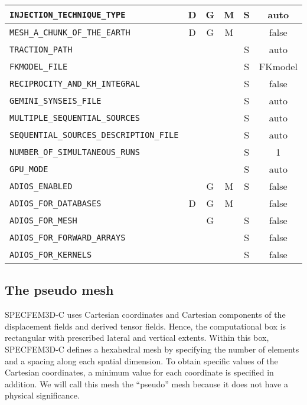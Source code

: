 \begin{longtable}{|p{7.7cm}|c|c|c|c|c|}
      \verb+INJECTION_TECHNIQUE_TYPE+      & D & G & M & S & auto \\ \hline
      \verb+MESH_A_CHUNK_OF_THE_EARTH+     & D & G & M &   & false \\ \hline
      \verb+TRACTION_PATH+                 &   &   &   & S & auto \\ \hline
      \verb+FKMODEL_FILE+                  &   &   &   & S & FKmodel \\ \hline
      \verb+RECIPROCITY_AND_KH_INTEGRAL+   &   &   &   & S & false \\ \hline
      \verb+GEMINI_SYNSEIS_FILE+           &   &   &   & S & auto \\ \hline
      \verb+MULTIPLE_SEQUENTIAL_SOURCES+   &   &   &   & S & auto \\ \hline
      \verb+SEQUENTIAL_SOURCES_DESCRIPTION_FILE+   &   &   &   & S & auto \\ \hline
      \verb+NUMBER_OF_SIMULTANEOUS_RUNS+   &   &   &   & S & 1 \\ \hline
      \verb+GPU_MODE+                      &   &   &   & S & auto \\ \hline
      \verb+ADIOS_ENABLED+                 &   & G & M & S & false \\ \hline
      \verb+ADIOS_FOR_DATABASES+           & D & G & M &   & false \\ \hline
      \verb+ADIOS_FOR_MESH+                &   & G &   & S & false \\ \hline
      \verb+ADIOS_FOR_FORWARD_ARRAYS+      &   &  &    & S & false \\ \hline
      \verb+ADIOS_FOR_KERNELS+             &   &  &    & S & false \\ \hline
\end{longtable}
%
\subsection{The pseudo mesh}
 \label{sec:mesh}
%
SPECFEM3D-C uses Cartesian coordinates and Cartesian components of the displacement fields and derived tensor fields. Hence, the computational box is rectangular with prescribed lateral and vertical extents. Within this box, SPECFEM3D-C defines a hexahedral mesh by specifying the number of elements and a spacing along each spatial dimension. To obtain specific values of the Cartesian coordinates, a minimum value for each coordinate is specified in addition. We will call this mesh the ``pseudo'' mesh because it does not have a physical significance.

